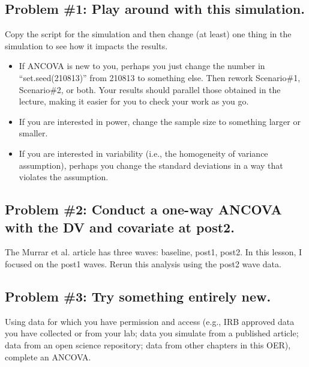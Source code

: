 \documentclass[
  11pt,
]{book}
\providecommand{\tightlist}{%
  \setlength{\itemsep}{0pt}\setlength{\parskip}{0pt}}
\begin{document}
\hypertarget{problem-1-play-around-with-this-simulation.-3}{%
\subsection{Problem \#1: Play around with this simulation.}\label{problem-1-play-around-with-this-simulation.-3}}

Copy the script for the simulation and then change (at least) one thing in the simulation to see how it impacts the results.

\begin{itemize}
\tightlist
\item
  If ANCOVA is new to you, perhaps you just change the number in ``set.seed(210813)'' from 210813 to something else. Then rework Scenario\#1, Scenario\#2, or both. Your results should parallel those obtained in the lecture, making it easier for you to check your work as you go.
\item
  If you are interested in power, change the sample size to something larger or smaller.
\item
  If you are interested in variability (i.e., the homogeneity of variance assumption), perhaps you change the standard deviations in a way that violates the assumption.
\end{itemize}

\hypertarget{problem-2-conduct-a-one-way-ancova-with-the-dv-and-covariate-at-post2.}{%
\subsection{Problem \#2: Conduct a one-way ANCOVA with the DV and covariate at post2.}\label{problem-2-conduct-a-one-way-ancova-with-the-dv-and-covariate-at-post2.}}

The Murrar et al. \citeyearpar{murrar_entertainment-education_2018}article has three waves: baseline, post1, post2. In this lesson, I focused on the post1 waves. Rerun this analysis using the post2 wave data.

\hypertarget{problem-3-try-something-entirely-new.-3}{%
\subsection{Problem \#3: Try something entirely new.}\label{problem-3-try-something-entirely-new.-3}}

Using data for which you have permission and access (e.g., IRB approved data you have collected or from your lab; data you simulate from a published article; data from an open science repository; data from other chapters in this OER), complete an ANCOVA.
\end{document}
